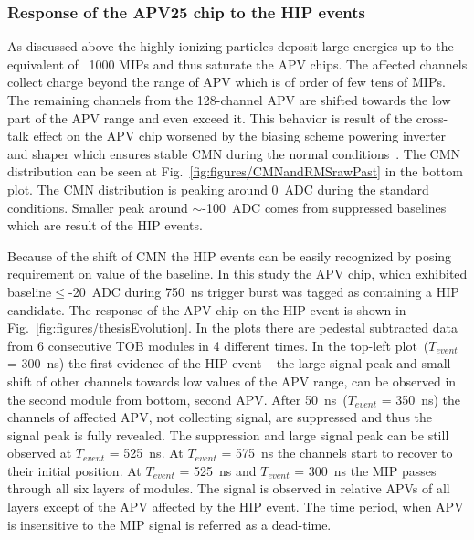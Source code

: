 

\subsubsection{Response of the APV25 chip to the HIP events}

As discussed above the highly ionizing particles deposit large energies up to the equivalent of ~1000 MIPs and thus saturate the APV chips. The affected channels collect charge beyond the range of APV which is of order of few tens of MIPs. The remaining channels from the 128-channel APV are shifted towards the low part of the APV range and even exceed it. This behavior is result of the cross-talk effect on the APV chip worsened by the biasing scheme powering inverter and shaper which ensures stable CMN during the normal conditions~\cite{Bainbridge:2004jc}. The CMN distribution can be seen at Fig.~\ref{fig:figures/CMNandRMSrawPast} in the bottom plot. The CMN distribution is peaking around 0~ADC during the standard conditions. Smaller peak around $\sim$-100~ADC comes from suppressed baselines which are result of the HIP events. 

Because of the shift of CMN the HIP events can be easily recognized by posing requirement on value of the baseline. In this study the APV chip, which exhibited baseline$\leq$-20~ADC during 750~ns trigger burst was tagged as containing a  HIP candidate. The response of the APV chip on the HIP event is shown in Fig.~\ref{fig:figures/thesisEvolution}. In the plots there are pedestal subtracted data from 6 consecutive TOB modules in 4 different times. In the top-left plot~($T_{event}$ = 300~ns) the first evidence of the HIP event -- the large signal peak and small shift of other channels towards low values of the APV range, can be observed in the second module from bottom, second APV. After 50~ns~($T_{event}$ = 350~ns) the channels of affected APV, not collecting signal, are suppressed and thus the signal peak is fully revealed. The suppression and large signal peak can be still observed at $T_{event}$ = 525~ns. At $T_{event}$ = 575~ns the channels start to recover to their initial position. At $T_{event}$ = 525~ns and $T_{event}$ = 300~ns the MIP passes through all six layers of modules. The signal is observed in relative APVs of all layers except of the APV affected by the HIP event. The time period, when APV is insensitive to the MIP signal is referred as a dead-time.

